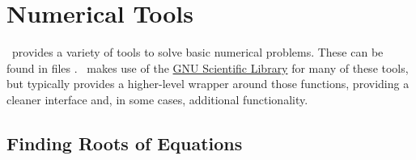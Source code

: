 \section{Numerical Tools}

\glc\ provides a variety of tools to solve basic numerical problems. These can be found in files . \glc\ makes use of the \href{http://www.gnu.org/software/gsl/}{GNU Scientific Library} for many of these tools, but typically provides a higher-level wrapper around those functions, providing a cleaner interface and, in some cases, additional functionality.

\subsection{Finding Roots of Equations}

